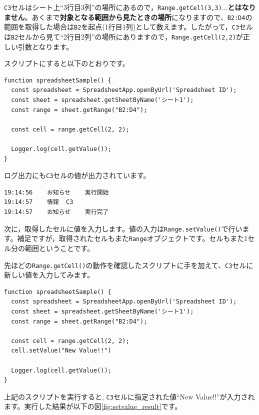 \documentclass[uplatex,a4j]{jsarticle}
\begin{document}
\verb|C3|セルはシート上``3行目3列''の場所にあるので，\verb|Range.getCell(3,3)|...\textbf{とはなりません}。あくまで\textbf{対象となる範囲から見たときの場所}になりますので、\verb|B2:D4|の範囲を取得した場合は\verb|B2|を起点(1行目1列)として数えます。したがって，\verb|C3|セルは\verb|B2|セルから見て``2行目2列''の場所にありますので，\verb|Range.getCell(2,2)|が正しい引数となります。

スクリプトにすると以下のとおりです。

\begin{lstlisting}[basicstyle=\ttfamily\footnotesize,frame=single,caption=Range.getCellで特定のセルを取得する]
function spreadsheetSample() {
  const spreadsheet = SpreadsheetApp.openByUrl('Spreadsheet ID');
  const sheet = spreadsheet.getSheetByName('シート1');
  const range = sheet.getRange("B2:D4");

  const cell = range.getCell(2, 2);
  
  Logger.log(cell.getValue());
}
\end{lstlisting}

ログ出力にも\verb|C3|セルの値が出力されています。

\begin{lstlisting}[basicstyle=\ttfamily\footnotesize,frame=single,caption=Range.getCell実行ログ例]
19:14:56	お知らせ	実行開始
19:14:57	情報	C3
19:14:57	お知らせ	実行完了
\end{lstlisting}

次に，取得したセルに値を入力します。値の入力は\verb|Range.setValue()|で行います。補足ですが，取得されたセルもまた\verb|Range|オブジェクトです。セルもまた1セル分の範囲ということです。

先ほどの\verb|Range.getCell()|の動作を確認したスクリプトに手を加えて、\verb|C3|セルに新しい値を入力してみます。

\begin{lstlisting}[basicstyle=\ttfamily\footnotesize,frame=single,caption=Range.setValueで特定のセルに値を入力する]
function spreadsheetSample() {
  const spreadsheet = SpreadsheetApp.openByUrl('Spreadsheet ID');
  const sheet = spreadsheet.getSheetByName('シート1');
  const range = sheet.getRange("B2:D4");

  const cell = range.getCell(2, 2);
  cell.setValue("New Value!!")

  Logger.log(cell.getValue());
}
\end{lstlisting}

上記のスクリプトを実行すると, \verb|C3|セルに指定された値``New Value!!''が入力されます。実行した結果が以下の図\ref{fig:setvalue_result}です。
\end{document}
